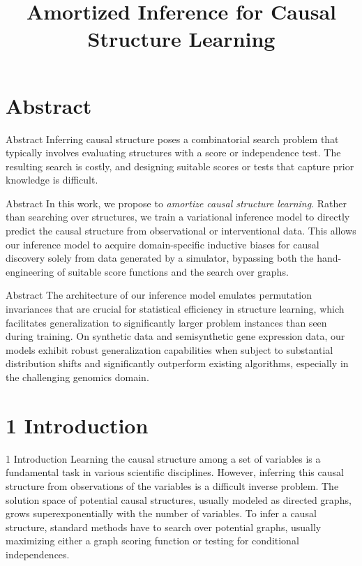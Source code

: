 \documentclass[aspectratio=169,10pt]{beamer}
\title{Amortized Inference for Causal Structure Learning}
\subtitle{}
\author{\cit{Lorch, Sussex, Rothfuss, Krause, Sch\"olkopf '22}}
\date{}
\begin{document}
\maketitle

\section{Abstract}

\begin{frame}{Abstract}
Inferring causal structure poses a combinatorial search problem that typically involves evaluating structures with a score or independence test. The resulting search is costly, and designing suitable scores or tests that capture prior knowledge is difficult.
\end{frame}

\begin{frame}{Abstract}
In this work, we propose to \emph{amortize causal structure learning}. Rather than searching over structures, we train a variational inference model to directly predict the causal structure from observational or interventional data. This allows our inference model to acquire domain-specific inductive biases for causal discovery solely from data generated by a simulator, bypassing both the hand-engineering of suitable score functions and the search over graphs.
\end{frame}

\begin{frame}{Abstract}
The architecture of our inference model emulates permutation invariances that are crucial for statistical efficiency in structure learning, which facilitates generalization to significantly larger problem instances than seen during training. On synthetic data and semisynthetic gene expression data, our models exhibit robust generalization capabilities when subject to substantial distribution shifts and significantly outperform existing algorithms, especially in the challenging genomics domain.
\end{frame}

\section{1 Introduction}

\begin{frame}{1 Introduction}
Learning the causal structure among a set of variables is a fundamental task in various scientific disciplines. However, inferring this causal structure from observations of the variables is a difficult inverse problem. The solution space of potential causal structures, usually modeled as directed graphs, grows superexponentially with the number of variables. To infer a causal structure, standard methods have to search over potential graphs, usually maximizing either a graph scoring function or testing for conditional independences.
\end{frame}
\end{document}
